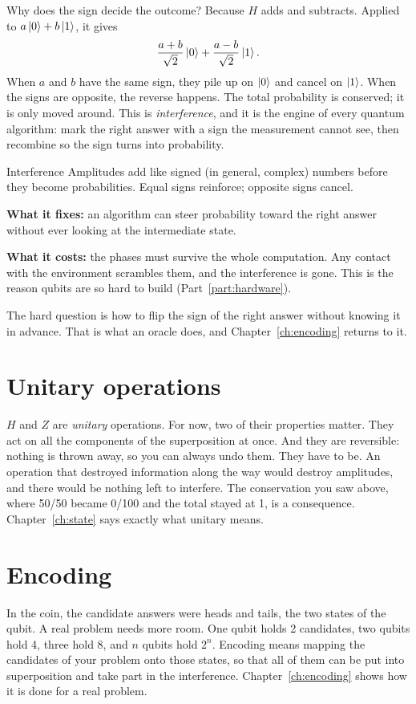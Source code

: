 Why does the sign decide the outcome? Because $H$ adds and subtracts. Applied to
$a\ket{0} + b\ket{1}$, it gives
\[
  \frac{a + b}{\sqrt{2}}\ket{0} + \frac{a - b}{\sqrt{2}}\ket{1}.
\]
When $a$ and $b$ have the same sign, they pile up on $\ket{0}$ and cancel on
$\ket{1}$. When the signs are opposite, the reverse happens. The total
probability is conserved; it is only moved around. This is \emph{interference},
and it is the engine of every quantum algorithm: mark the right answer with a sign
the measurement cannot see, then recombine so the sign turns into probability.

\begin{concept}{Interference}
Amplitudes add like signed (in general, complex) numbers before they become
probabilities. Equal signs reinforce; opposite signs cancel.

\textbf{What it fixes:} an algorithm can steer probability toward the right
answer without ever looking at the intermediate state.

\textbf{What it costs:} the phases must survive the whole computation. Any
contact with the environment scrambles them, and the interference is gone. This
is the reason qubits are so hard to build (Part~\ref{part:hardware}).
\end{concept}

The hard question is how to flip the sign of the right answer without knowing it
in advance. That is what an oracle does, and Chapter~\ref{ch:encoding} returns
to it.

\section{Unitary operations}

$H$ and $Z$ are \emph{unitary} operations. For now, two of their properties
matter. They act on all the components of the superposition at once. And they
are reversible: nothing is thrown away, so you can always undo them. They have to
be. An operation that destroyed information along the way would destroy
amplitudes, and there would be nothing left to interfere. The conservation you
saw above, where 50/50 became 0/100 and the total stayed at 1, is a consequence.
Chapter~\ref{ch:state} says exactly what unitary means.

\section{Encoding}

In the coin, the candidate answers were heads and tails, the two states of the
qubit. A real problem needs more room. One qubit holds 2 candidates, two qubits
hold 4, three hold 8, and $n$ qubits hold $2^n$. Encoding means mapping the
candidates of your problem onto those states, so that all of them can be put into
superposition and take part in the interference. Chapter~\ref{ch:encoding} shows
how it is done for a real problem.

